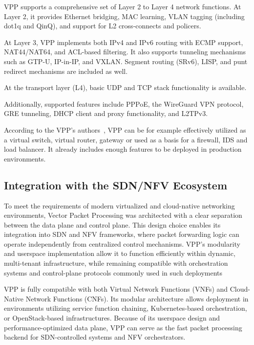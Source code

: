 VPP supports a comprehensive set of Layer 2 to Layer 4 network functions. 
At Layer 2, it provides Ethernet bridging, MAC learning, VLAN tagging (including dot1q and QinQ), and support for L2 cross-connects and policers.

At Layer 3, VPP implements both IPv4 and IPv6 routing with ECMP support, NAT44/NAT64, and ACL-based filtering. 
It also supports tunneling mechanisms such as GTP-U, IP-in-IP, and VXLAN. Segment routing (SRv6), LISP, and punt redirect mechanisms are included as well.

At the transport layer (L4), basic UDP and TCP stack functionality is available. 

Additionally, supported features include PPPoE, the WireGuard VPN protocol, GRE tunneling, DHCP client and proxy functionality, and L2TPv3.~\cite{fdio-vpp-features-2502}

According to the VPP's authors~\cite{fdio_what_is_vpp}, VPP can be for example effectively utilized as a virtual switch, virtual router, gateway or used as a basis for a firewall, IDS and load balancer.
It already includes enough features to be deployed in production environments.


\subsection{Integration with the SDN/NFV Ecosystem}
To meet the requirements of modern virtualized and cloud-native networking environments, Vector Packet Processing was architected with a clear separation between the data plane and control plane. 
This design choice enables its integration into SDN and NFV frameworks, where packet forwarding logic can operate independently from centralized control mechanisms. 
VPP's modularity and userspace implementation allow it to function efficiently within dynamic, multi-tenant infrastructure, 
while remaining compatible with orchestration systems and control-plane protocols commonly used in such deployments

VPP is fully compatible with both Virtual Network Functions (VNFs) and Cloud-Native Network Functions (CNFs). 
Its modular architecture allows deployment in environments utilizing service function chaining, Kubernetes-based orchestration, or OpenStack-based infrastructures. 
Because of its userspace design and performance-optimized data plane, VPP can serve as the fast packet processing backend for SDN-controlled systems and NFV orchestrators.~\cite{fdio2017whitepaper}

